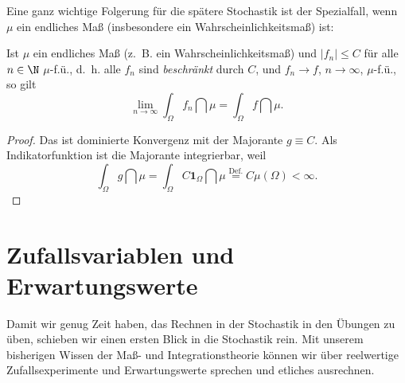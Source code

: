 Eine ganz wichtige Folgerung f\"ur die sp\"atere Stochastik ist der Spezialfall, wenn $\mu$ ein endliches Ma\ss{} (insbesondere ein Wahrscheinlichkeitsma\ss ) ist:
\begin{korollar}\label{K7}
	Ist $\mu$ ein endliches Maß (\mbox{z. B.} ein Wahrscheinlichkeitsmaß) und $|f_n| \leq C$ für alle $n \in \N$ $\mu$-f.\"u., \mbox{d. h.} alle $f_n$ sind \textit{beschränkt} durch $C$, und $f_n \to f$, $n\to \infty$, $\mu$-f.\"u., so gilt \[ \lim\limits_{n \to \infty} \int_{\Omega} f_n \dint \mu = \int_{\Omega} f \dint \mu. \]
\end{korollar}

\begin{proof}
	Das ist dominierte Konvergenz mit der Majorante $ g \equiv C$. Als Indikatorfunktion ist die Majorante integrierbar, weil \[ \int_{\Omega} g \dint \mu = \int_{\Omega} C \mathbf{1}_{\Omega} \dint \mu \overset{\text{Def.}}{=} C \mu(\Omega) < \infty. \]
\end{proof}
\section{Zufallsvariablen und Erwartungswerte}
Damit wir genug Zeit haben, das Rechnen in der Stochastik in den \"Ubungen zu \"uben, schieben wir einen ersten Blick in die Stochastik rein. Mit unserem bisherigen Wissen der Ma\ss- und Integrationstheorie k\"onnen wir \"uber reelwertige Zufallsexperimente und Erwartungswerte sprechen und etliches ausrechnen.\smallskip

